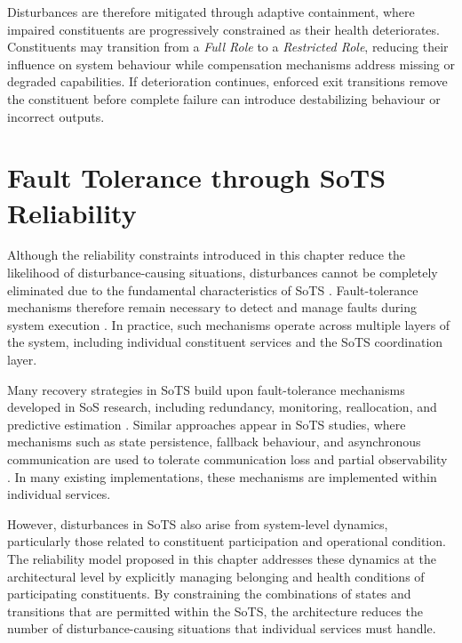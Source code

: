 Disturbances are therefore mitigated through adaptive containment, where impaired constituents are progressively constrained as their health deteriorates. Constituents may transition from a \textit{Full Role} to a \textit{Restricted Role}, reducing their influence on system behaviour while compensation mechanisms address missing or degraded capabilities. If deterioration continues, enforced exit transitions remove the constituent before complete failure can introduce destabilizing behaviour or incorrect outputs.

\section{Fault Tolerance through SoTS Reliability} \label{sec:reducing-fault-tolerance-burden}

Although the reliability constraints introduced in this chapter reduce the likelihood of disturbance-causing situations, disturbances cannot be completely eliminated due to the fundamental characteristics of SoTS \cite{nielsen2015systems,ferreira2023towards}. Fault-tolerance mechanisms therefore remain necessary to detect and manage faults during system execution \cite{hanmer2013patterns,avizienis2004basic}. In practice, such mechanisms operate across multiple layers of the system, including individual constituent services and the SoTS coordination layer.

Many recovery strategies in SoTS build upon fault-tolerance mechanisms developed in SoS research, including redundancy, monitoring, reallocation, and predictive estimation \cite{ferreira2021reliability,uday2015designing,abdelmoumen2026comprehensive}. Similar approaches appear in SoTS studies, where mechanisms such as state persistence, fallback behaviour, and asynchronous communication are used to tolerate communication loss and partial observability \cite{esterle2021digital,larsen2024towards,lopez2023modeling,chen2018digital,joseph2021aggregated}. In many existing implementations, these mechanisms are implemented within individual services.

However, disturbances in SoTS also arise from system-level dynamics, particularly those related to constituent participation and operational condition. The reliability model proposed in this chapter addresses these dynamics at the architectural level by explicitly managing belonging and health conditions of participating constituents. By constraining the combinations of states and transitions that are permitted within the SoTS, the architecture reduces the number of disturbance-causing situations that individual services must handle.

